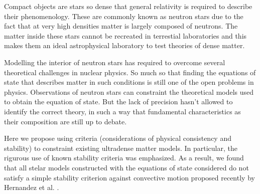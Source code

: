 \begin{abstract1}
    Compact objects are stars so dense that general relativity is required to describe their phenomenology. These are commonly known as neutron stars due to the fact that at very high densities matter is largely composed of neutrons. The matter inside these stars cannot be recreated in terrestial laboratories and this makes them an ideal astrophysical laboratory to test theories of dense matter.
    
    Modelling the interior of neutron stars has required to overcome several theoretical challenges in nuclear physics. So much so that finding the equations of state that describes matter in such conditions is still one of the open problems in physics. Observations of neutron stars can constraint the theoretical models used to obtain the equation of state. But the lack of precision hasn't allowed to identify the correct theory, in such a way that fundamental characteristics as their composition are still up to debate.
    
    Here we propose using  criteria (considerations of physical consistency and stability) to constraint existing ultradense matter models. In particular, the rigurous use of known stability criteria was emphasized. As a result, we found that all stelar models constructed with the equations of state considered do not satisfy a simple stability criterion against convective motion proposed recently by Hernandez et al. \cite{Hernandez2018}.
\end{abstract1}
